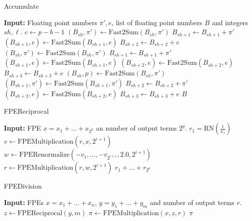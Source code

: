 \begin{algorithm}
    \caption{Accumulate}\label{alg:accumulate}
    \begin{algorithmic}[1]
        \STATE \textbf{Input:} Floating point numbers $\pi', e$, list of floating point numbers $B$ and integers $sh, \ell$.
        \STATE $c \gets p - b - 1$
            \STATE $(B_{sh}, \pi') \gets \text{Fast2Sum}(B_{sh}, \pi')$
            \STATE $B_{sh + 1} \gets B_{sh + 1} + \pi'$
            \STATE $(B_{sh+1}, e) \gets \text{Fast2Sum}(B_{sh+1}, e)$
            \STATE $B_{sh + 2} \gets B_{sh + 2} + e$
            \STATE $(B_{sh}, \pi') \gets \text{Fast2Sum}(B_{sh}, \pi')$
            \STATE $B_{sh + 1} \gets B_{sh + 1} + \pi'$
            \STATE $(B_{sh + 1}, e) \gets \text{Fast2Sum}(B_{sh + 1}, e)$
            \STATE $(B_{sh+2}, e) \gets \text{Fast2Sum}(B_{sh+2}, e)$
            \STATE $B_{sh + 3} \gets B_{sh + 3} + e$
        \ELSE
            \STATE $(B_{sh}, p) \gets \text{Fast2Sum}(B_{sh}, \pi')$
            \STATE $(B_{sh + 1}, \pi') \gets \text{Fast2Sum}(B_{sh + 1}, \pi')$
            \STATE $B_{sh + 2} \gets B_{sh + 2} + \pi'$
            \STATE $(B_{sh+2}, e) \gets \text{Fast2Sum}(B_{sh+2}, e)$
            \STATE $B_{sh + 3} \gets B_{sh + 3} + e$
        \ENDIF
        \RETURN $B$
    \end{algorithmic}
\end{algorithm}

\begin{algorithm}
    \caption{FPEReciprocal}\label{alg:fpe_reciprocal}
    \begin{algorithmic}[1]
        \STATE \textbf{Input:} FPE $x = x_1 + \ldots + x_{2^k}$ an number of output terms $2^q$.
        \STATE $r_1 = \text{RN}(\frac{1}{x_1})$
            \STATE $v \gets \text{FPEMultiplication}(r, x, 2^{i + 1})$
            \STATE $w \gets \text{FPERenormalize}(-v_1, \ldots, -v_{2^{i + 1}}, 2.0, 2^{i + 1})$
            \STATE $r \gets \text{FPEMultiplication}(r, w, 2^{i + 1})$
        \ENDFOR
        \RETURN $r_1 + \ldots + r_{2^q}$
    \end{algorithmic}
\end{algorithm}

\begin{algorithm}
    \caption{FPEDivision}\label{alg:fpe_division}
    \begin{algorithmic}[1]
        \STATE \textbf{Input:} FPEs $x = x_1 + \ldots + x_n$, $y = y_1 + \ldots + y_m$ and number of output terms $r$.
        \STATE $z \gets \text{FPEReciprocal}(y, m)$
        \STATE $\pi \gets \text{FPEMultiplication}(x, z, r)$
        \RETURN $\pi$
    \end{algorithmic}
\end{algorithm}

